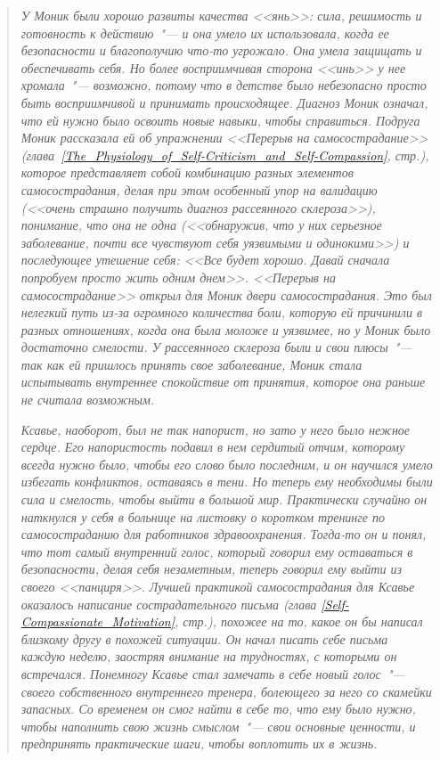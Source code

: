 \begin{quotation}
	\textit{
		У Моник были хорошо развиты качества <<янь>>: сила, решимость и готовность к действию~"--- и она умело их использовала, когда ее безопасности и благополучию что-то угрожало. Она умела защищать и обеспечивать себя. Но более восприимчивая сторона <<инь>> у нее хромала~"--- возможно, потому что в детстве было небезопасно просто быть восприимчивой и принимать происходящее. Диагноз Моник означал, что ей нужно было освоить новые навыки, чтобы справиться. Подруга Моник рассказала ей об упражнении <<Перерыв на самосострадание>> (глава~\ref{The_Physiology_of_Self-Criticism_and_Self-Compassion}, стр.\:\pageref{IP:Self-Compassion_Break}), которое представляет собой комбинацию разных элементов самосострадания, делая при этом особенный упор на валидацию (<<очень страшно получить диагноз рассеянного склероза>>), понимание, что она не одна (<<обнаружив, что у них серьезное заболевание, почти все чувствуют себя уязвимыми и одинокими>>) и последующее утешение себя: <<Все будет хорошо. Давай сначала попробуем просто жить одним днем>>. <<Перерыв на самосострадание>> открыл для Моник двери самосострадания. Это был нелегкий путь из-за огромного количества боли, которую ей причинили в разных отношениях, когда она была моложе и уязвимее, но у Моник было достаточно смелости. У рассеянного склероза были и свои плюсы~"--- так как ей пришлось принять свое заболевание, Моник стала испытывать внутреннее спокойствие от принятия, которое она раньше не считала возможным.
	}
		
	\textit{
		Ксавье, наоборот, был не так напорист, но зато у него было нежное сердце. Его напористость подавил в нем сердитый отчим, которому всегда нужно было, чтобы его слово было последним, и он научился умело избегать конфликтов, оставаясь в тени. Но теперь ему необходимы были сила и смелость, чтобы выйти в большой мир. Практически случайно он наткнулся у себя в больнице на листовку о коротком тренинге по самосостраданию для работников здравоохранения. Тогда-то он и понял, что тот самый внутренний голос, который говорил ему оставаться в безопасности, делая себя незаметным, теперь говорил ему выйти из своего <<панциря>>. Лучшей практикой самосострадания для Ксавье оказалось написание сострадательного письма (глава \ref{Self-Compassionate_Motivation}, стр.\:\pageref{IP:Compassionate_Letter_to_Myself}), похожее на то, какое он бы написал близкому другу в похожей ситуации. Он начал писать себе письма каждую неделю, заостряя внимание на трудностях, с которыми он встречался. Понемногу Ксавье стал замечать в себе новый голос~"--- своего собственного внутреннего тренера, болеющего за него со скамейки запасных. Со временем он смог найти в себе то, что ему было нужно, чтобы наполнить свою жизнь смыслом~"--- свои основные ценности, и предпринять практические шаги, чтобы воплотить их в жизнь.
	}
\end{quotation}

